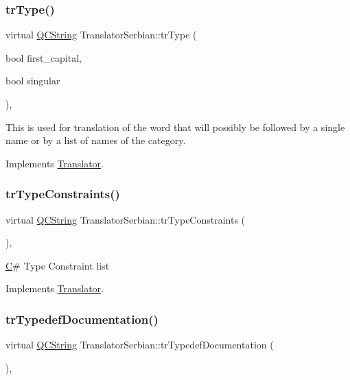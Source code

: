 \subsubsection{\texorpdfstring{trType()}{trType()}}
{\footnotesize\ttfamily virtual \mbox{\hyperlink{class_q_c_string}{Q\+C\+String}} Translator\+Serbian\+::tr\+Type (\begin{DoxyParamCaption}\item[{bool}]{first\+\_\+capital,  }\item[{bool}]{singular }\end{DoxyParamCaption})\hspace{0.3cm}{\ttfamily [inline]}, {\ttfamily [virtual]}}

This is used for translation of the word that will possibly be followed by a single name or by a list of names of the category. 

Implements \mbox{\hyperlink{class_translator}{Translator}}.

\mbox{\label{class_translator_serbian_ae7b216be473a626ac47e09be80c4e6cf}} 
\subsubsection{\texorpdfstring{trTypeConstraints()}{trTypeConstraints()}}
{\footnotesize\ttfamily virtual \mbox{\hyperlink{class_q_c_string}{Q\+C\+String}} Translator\+Serbian\+::tr\+Type\+Constraints (\begin{DoxyParamCaption}{ }\end{DoxyParamCaption})\hspace{0.3cm}{\ttfamily [inline]}, {\ttfamily [virtual]}}

\mbox{\hyperlink{class_c}{C}}\# Type Constraint list 

Implements \mbox{\hyperlink{class_translator}{Translator}}.

\mbox{\label{class_translator_serbian_a6062bcd75e680969a4389945e4917211}} 
\subsubsection{\texorpdfstring{trTypedefDocumentation()}{trTypedefDocumentation()}}
{\footnotesize\ttfamily virtual \mbox{\hyperlink{class_q_c_string}{Q\+C\+String}} Translator\+Serbian\+::tr\+Typedef\+Documentation (\begin{DoxyParamCaption}{ }\end{DoxyParamCaption})\hspace{0.3cm}{\ttfamily [inline]}, {\ttfamily [virtual]}}

